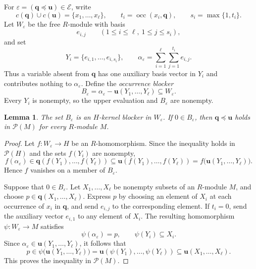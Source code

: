 \documentclass[11pt,reqno]{amsart}
\newtheorem{lemma}[theorem]{Lemma}
\theoremstyle{definition}
\numberwithin{equation}{section}
\newcommand{\Pow}{\mathcal{P}}
\newcommand{\occ}{\operatorname{occ}}
\newcommand{\bu}{\mathbf{u}}
\newcommand{\bq}{\mathbf{q}}
\newcommand{\calE}{\mathcal{E}}
\renewcommand{\leq}{\leqslant}
\begin{document}
For $\varepsilon=(\bq\preceq\bu)\in\calE$, write
\[
 c(\bq)\cup c(\bu)=\{x_1,\ldots,x_\ell\},\qquad
 t_i=\occ(x_i,\bq),\qquad s_i=\max\{1,t_i\}.
\]
Let $W_\varepsilon$ be the free $R$-module with basis
\[
 e_{i,j}\qquad(1\leq i\leq\ell,\ 1\leq j\leq s_i),
\]
and set
\begin{equation}\label{eq:occurrence}
 Y_i=\{e_{i,1},\ldots,e_{i,s_i}\},\qquad
 \alpha_\varepsilon=\sum_{i=1}^{\ell}\sum_{j=1}^{t_i}e_{i,j}.
\end{equation}
Thus a variable absent from $\bq$ has one auxiliary basis vector in $Y_i$ and contributes nothing to $\alpha_\varepsilon$. Define the \emph{occurrence blocker}
\begin{equation}\label{eq:blocker}
 B_\varepsilon=\alpha_\varepsilon-\bu(Y_1,\ldots,Y_\ell)
 \subseteq W_\varepsilon.
\end{equation}
Every $Y_i$ is nonempty, so the upper evaluation and $B_\varepsilon$ are nonempty.

\begin{lemma}\label{lem:occurrence}
The set $B_\varepsilon$ is an $H$-kernel blocker in $W_\varepsilon$. If $0\in B_\varepsilon$, then $\bq\preceq\bu$ holds in $\Pow(M)$ for every $R$-module $M$.
\end{lemma}
\begin{proof}
Let $f:W_\varepsilon\to H$ be an $R$-homomorphism. Since the inequality holds in $\Pow(H)$ and the sets $f(Y_i)$ are nonempty,
\[
 f(\alpha_\varepsilon)
 \in\bq(f(Y_1),\ldots,f(Y_\ell))
 \subseteq\bu(f(Y_1),\ldots,f(Y_\ell))
 =f\bigl(\bu(Y_1,\ldots,Y_\ell)\bigr).
\]
Hence $f$ vanishes on a member of $B_\varepsilon$.

Suppose that $0\in B_\varepsilon$. Let $X_1,\ldots,X_\ell$ be nonempty subsets of an $R$-module $M$, and choose $p\in\bq(X_1,\ldots,X_\ell)$. Express $p$ by choosing an element of $X_i$ at each occurrence of $x_i$ in $\bq$, and send $e_{i,j}$ to the corresponding element. If $t_i=0$, send the auxiliary vector $e_{i,1}$ to any element of $X_i$. The resulting homomorphism $\psi:W_\varepsilon\to M$ satisfies
\begin{equation}\label{eq:occurrencemap}
 \psi(\alpha_\varepsilon)=p,\qquad \psi(Y_i)\subseteq X_i.
\end{equation}
Since $\alpha_\varepsilon\in\bu(Y_1,\ldots,Y_\ell)$, it follows that
\[
 p\in\psi\bigl(\bu(Y_1,\ldots,Y_\ell)\bigr)
 =\bu(\psi(Y_1),\ldots,\psi(Y_\ell))
 \subseteq\bu(X_1,\ldots,X_\ell).
\]
This proves the inequality in $\Pow(M)$.
\end{proof}
\end{document}
